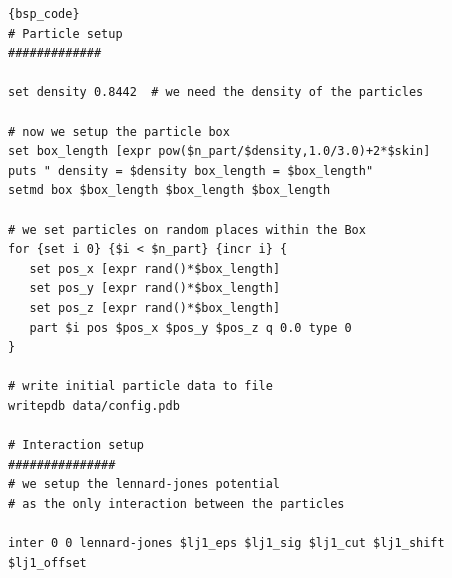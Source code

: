 \documentclass[
paper=a4,                       %
fontsize=11pt,                  %
twoside,                        %
footsepline,                    %
headsepline,                    %
headinclude=false,              %
footinclude=false,              %
pagesize,                       %
]{scrartcl}
\newtheorem{task}{Task}
\begin{document}
{\small\vspace{0,2cm}
\begin{lstlisting}[firstnumber=auto]{bsp_code}
# Particle setup
#############

set density 0.8442	# we need the density of the particles

# now we setup the particle box
set box_length [expr pow($n_part/$density,1.0/3.0)+2*$skin]
puts " density = $density box_length = $box_length"
setmd box $box_length $box_length $box_length

# we set particles on random places within the Box
for {set i 0} {$i < $n_part} {incr i} {
   set pos_x [expr rand()*$box_length]
   set pos_y [expr rand()*$box_length]
   set pos_z [expr rand()*$box_length]
   part $i pos $pos_x $pos_y $pos_z q 0.0 type 0
}

# write initial particle data to file
writepdb data/config.pdb

# Interaction setup
###############
# we setup the lennard-jones potential 
# as the only interaction between the particles

inter 0 0 lennard-jones $lj1_eps $lj1_sig $lj1_cut $lj1_shift $lj1_offset
\end{lstlisting}}\vspace{0,2cm}

   \vspace{1cm}\vspace{1cm}
\end{document}
